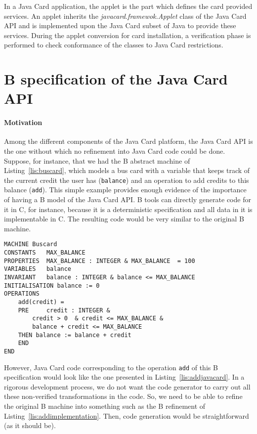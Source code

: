 \documentclass{llncs}
\begin{document}
In a Java Card application, the applet is the part which defines the card provided services. 
An applet inherits the \emph{javacard.framewok.Applet} class of the Java Card API and is
implemented upon the Java Card subset of Java to provide these services.  During the applet
conversion for card installation, a verification phase is performed to
check conformance of the classes to Java Card restrictions.

\section{B specification of the Java Card API}\label{sec:api-spec}

\paragraph{Motivation}
Among the different components of the Java Card platform, the Java
Card API is the one without which no refinement into Java Card code
could be done.  Suppose, for instance, that we had the B abstract
machine of Listing~\ref{lis:buscard}, which models a bus card with a
variable that keeps track of the current credit the user has
(\texttt{balance}) and an operation to add credits to this balance
(\texttt{add}). This simple example provides enough evidence of the
importance of having a B model of the Java Card API.  B tools can
directly generate code for it in C, for instance, because it is a
deterministic specification and all data in it is implementable in C.
The resulting code would be very similar to the original B machine.

\begin{lstlisting}
MACHINE	Buscard
CONSTANTS	MAX_BALANCE
PROPERTIES	MAX_BALANCE : INTEGER & MAX_BALANCE  = 100
VARIABLES	balance
INVARIANT	balance : INTEGER & balance <= MAX_BALANCE 
INITIALISATION balance := 0
OPERATIONS
	add(credit) =
	PRE 	credit : INTEGER &  
		credit > 0  & credit <= MAX_BALANCE & 
		balance + credit <= MAX_BALANCE 
	THEN balance := balance + credit
	END
END
\end{lstlisting}

However, Java Card code corresponding to the operation \texttt{add} of
this B specification would look like the one presented in
Listing~\ref{lis:addjavacard}. In a rigorous development process, we do
not want the code generator to carry out all these non-verified
transformations in the code. So, we need to be able to refine the
original B machine into something such as the B refinement of
Listing~\ref{lis:addimplementation}. Then, code generation would be
straightforward (as it should be).
\end{document}
